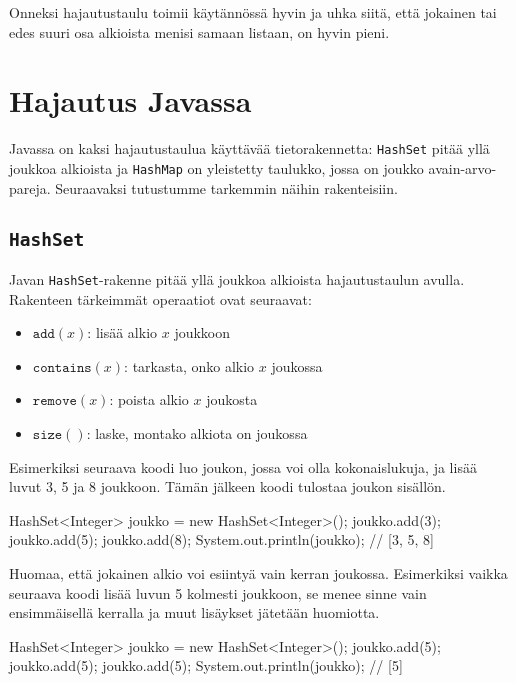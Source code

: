 Onneksi hajautustaulu toimii käytännössä hyvin ja 
uhka siitä, että jokainen tai edes suuri osa alkioista
menisi samaan listaan, on hyvin pieni.

\section{Hajautus Javassa}

Javassa on kaksi hajautustaulua käyttävää tietorakennetta:
\texttt{HashSet} pitää yllä joukkoa alkioista
ja \texttt{HashMap} on yleistetty taulukko,
jossa on joukko avain-arvo-pareja.
Seuraavaksi tutustumme tarkemmin näihin rakenteisiin.

\subsection{\texttt{HashSet}}

Javan \texttt{HashSet}-rakenne pitää yllä joukkoa alkioista
hajautustaulun avulla.
Rakenteen tärkeimmät operaatiot ovat seuraavat:

\begin{itemize}
\item $\texttt{add}(x)$: lisää alkio $x$ joukkoon
\item $\texttt{contains}(x)$: tarkasta, onko alkio $x$ joukossa
\item $\texttt{remove}(x)$: poista alkio $x$ joukosta
\item $\texttt{size}()$: laske, montako alkiota on joukossa
\end{itemize}

Esimerkiksi seuraava koodi luo joukon, jossa voi olla
kokonaislukuja, ja lisää luvut 3, 5 ja 8 joukkoon.
Tämän jälkeen koodi tulostaa joukon sisällön.

\begin{code}
HashSet<Integer> joukko = new HashSet<Integer>();
joukko.add(3);
joukko.add(5);
joukko.add(8);
System.out.println(joukko); // [3, 5, 8]
\end{code}

Huomaa, että jokainen alkio voi esiintyä vain kerran joukossa.
Esimerkiksi vaikka seuraava koodi lisää luvun 5 kolmesti
joukkoon, se menee sinne vain ensimmäisellä kerralla ja
muut lisäykset jätetään huomiotta.

\begin{code}
HashSet<Integer> joukko = new HashSet<Integer>();
joukko.add(5);
joukko.add(5);
joukko.add(5);
System.out.println(joukko); // [5]
\end{code}

